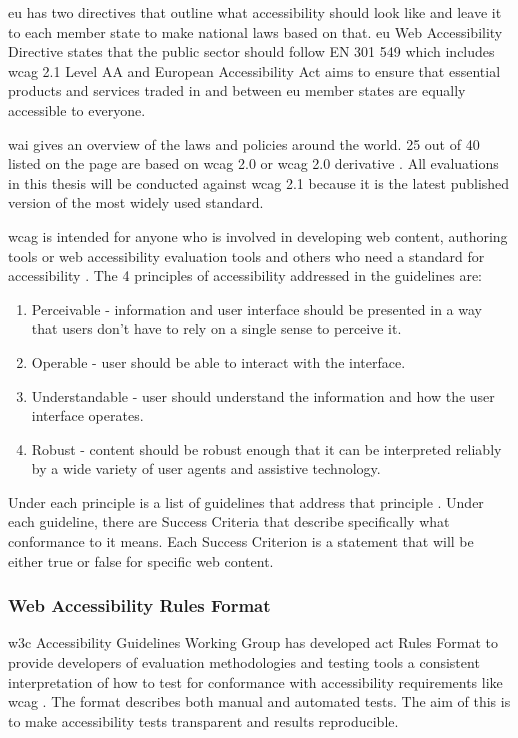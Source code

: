\documentclass{master_thesis}
\begin{document}
\ac{eu} has two directives that outline what accessibility should look like and leave it to each member state to make national laws based on that. \ac{eu} Web Accessibility Directive states that the public sector should follow EN 301 549 which includes \ac{wcag} 2.1 Level AA and European Accessibility Act aims to ensure that essential products and services traded in and between \ac{eu} member states are equally accessible to everyone.

\ac{wai} gives an overview of the laws and policies around the world. 25 out of 40 listed on the page are based on \ac{wcag} 2.0 or \ac{wcag} 2.0 derivative \citep{Mueller2018}. All evaluations in this thesis will be conducted against \ac{wcag} 2.1 because it is the latest published version of the most widely used standard.

\ac{wcag} is intended for anyone who is involved in developing web content, authoring tools or web accessibility evaluation tools and others who need a standard for accessibility \citep{Henry2023}. The 4 principles of accessibility addressed in the guidelines are:
\begin{enumerate}
	\item Perceivable - information and user interface should be presented in a way that users don't have to rely on a single sense to perceive it.
	\item Operable - user should be able to interact with the interface.
	\item Understandable - user should understand the information and how the user interface operates.
	\item Robust - content should be robust enough that it can be interpreted reliably by a wide variety of user agents and assistive technology.
\end{enumerate}
Under each principle is a list of guidelines that address that principle \citep{AGWGWP2022}. Under each guideline, there are Success Criteria that describe specifically what conformance to it means. Each Success Criterion is a statement that will be either true or false for specific web content.

\subsubsection{Web Accessibility Rules Format}

\ac{w3c} Accessibility Guidelines Working Group has developed \ac{act} Rules Format to provide developers of evaluation methodologies and testing tools a consistent interpretation of how to test for conformance with accessibility requirements like \ac{wcag} \citep{Fiers2019}. The format describes both manual and automated tests. The aim of this is to make accessibility tests transparent and results reproducible.
\end{document}
